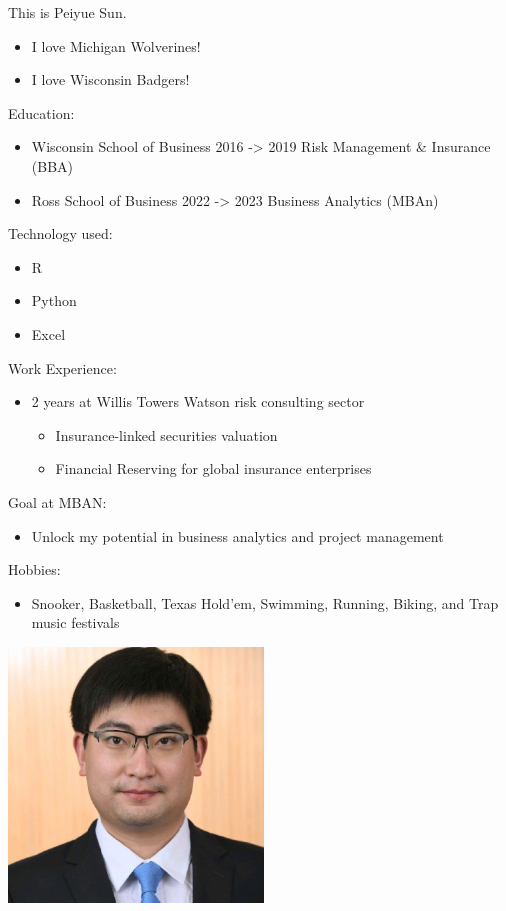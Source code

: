 \documentclass[
]{book}
\providecommand{\tightlist}{%
  \setlength{\itemsep}{0pt}\setlength{\parskip}{0pt}}
\begin{document}
This is Peiyue Sun.

\begin{itemize}
\tightlist
\item
  I love Michigan Wolverines!
\item
  I love Wisconsin Badgers!
\end{itemize}

Education:

\begin{itemize}
\tightlist
\item
  Wisconsin School of Business 2016 -\textgreater{} 2019 Risk Management \& Insurance (BBA)
\item
  Ross School of Business 2022 -\textgreater{} 2023 Business Analytics (MBAn)
\end{itemize}

Technology used:

\begin{itemize}
\tightlist
\item
  R
\item
  Python
\item
  Excel
\end{itemize}

Work Experience:

\begin{itemize}
\tightlist
\item
  2 years at Willis Towers Watson risk consulting sector

  \begin{itemize}
  \tightlist
  \item
    Insurance-linked securities valuation
  \item
    Financial Reserving for global insurance enterprises
  \end{itemize}
\end{itemize}

Goal at MBAN:

\begin{itemize}
\tightlist
\item
  Unlock my potential in business analytics and project management
\end{itemize}

Hobbies:

\begin{itemize}
\tightlist
\item
  Snooker, Basketball, Texas Hold'em, Swimming, Running, Biking, and Trap music festivals
\end{itemize}

\includegraphics[width=2.66667in,height=\textheight]{1.jpg}
\end{document}
